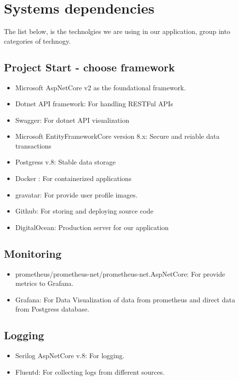 \section{Systems dependencies}

The list below, is the technolgies we are using in our application, group into categories of technogy.

\subsection*{Project Start - choose framework}

\begin{itemize}
	\item Microsoft AspNetCore v2 as the foundational framework.
	\item Dotnet API framework: For handling RESTFul APIs
	\item Swagger: For dotnet API visualization
	\item Microsoft EntityFrameworkCore version 8.x: Secure and reiable data transactions
	\item Postgress v.8: Stable data storage
	\item Docker : For containerized applications
	\item gravatar: For provide user profile images.
	\item Github: For storing and deploying source code
	\item DigitalOcean: Production server for our application
\end{itemize}

\subsection*{Monitoring}

\begin{itemize}
	\item prometheus/prometheus-net/prometheus-net.AspNetCore: For provide metrics to Grafana.
	\item Grafana: For Data Visualization of data from prometheus and direct data from Postgress database.
\end{itemize}

\subsection*{Logging}

\begin{itemize}
	\item Serilog AspNetCore v.8: For logging.
	\item Fluentd: For collecting logs from different sources.
\end{itemize}



